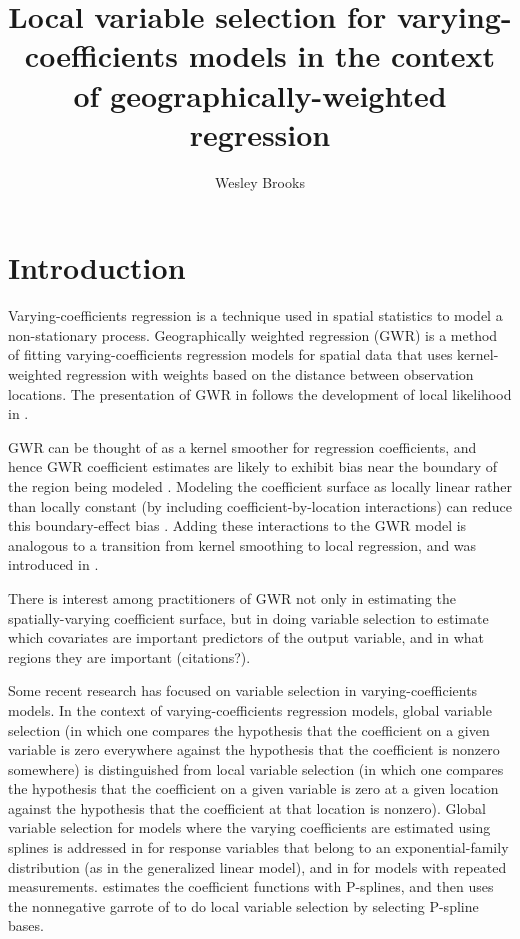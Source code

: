 \documentclass[authoryear, review, 11pt]{elsarticle}
\title{Local variable selection for varying-coefficients models in the context of geographically-weighted regression}
\author{Wesley Brooks}
\date{}                                           %
\begin{document}
\maketitle





\section{Introduction}
	Varying-coefficients regression \citep{Hastie:1993a} is a technique used in spatial statistics to model a non-stationary process. Geographically weighted regression (GWR) \citep{Fotheringham:2002} is a method of fitting varying-coefficients regression models for spatial data that uses kernel-weighted regression with weights based on the distance between observation locations. The presentation of GWR in \cite{Fotheringham:2002} follows the development of local likelihood in \cite{Loader:1999}.
	
	GWR can be thought of as a kernel smoother for regression coefficients, and hence GWR coefficient estimates are likely to exhibit bias near the boundary of the region being modeled \citep{Hastie:1993b}. Modeling the coefficient surface as locally linear rather than locally constant (by including coefficient-by-location interactions) can reduce this boundary-effect bias \citep{Hastie:1993b}. Adding these interactions to the GWR model is analogous to a transition from kernel smoothing to local regression, and was introduced in \cite{Wang:2008b}.
	
	There is interest among practitioners of GWR not only in estimating the spatially-varying coefficient surface, but in doing variable selection to estimate which covariates are important predictors of the output variable, and in what regions they are important (citations?).
	
	Some recent research has focused on variable selection in varying-coefficients models. In the context of varying-coefficients regression models, global variable selection (in which one compares the hypothesis that the coefficient on a given variable is zero everywhere against the hypothesis that the coefficient is nonzero somewhere) is distinguished from local variable selection (in which one compares the hypothesis that the coefficient on a given variable is zero at a given location against the hypothesis that the coefficient at that location is nonzero). Global variable selection for models where the varying coefficients are estimated using splines is addressed in \cite{Fan:1999} for response variables that belong to an exponential-family distribution (as in the generalized linear model), and in \cite{Wang:2008a} for models with repeated measurements. \cite{Antoniadis:2012a} estimates the coefficient functions with P-splines, and then uses the nonnegative garrote of \cite{Breiman:1995} to do local variable selection by selecting P-spline bases.
	
\end{document}
